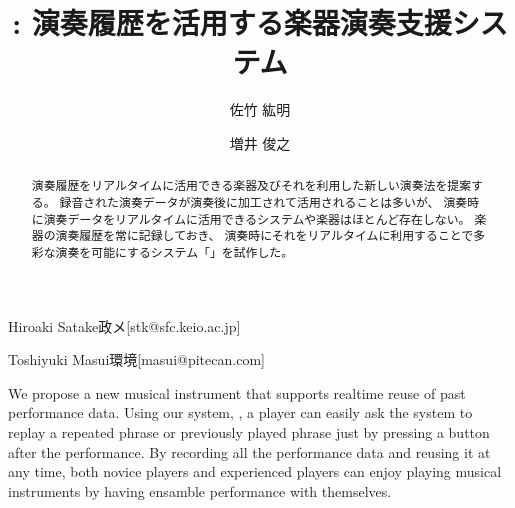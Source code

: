 \documentclass[submit,techreq]{ec2017}
\begin{document}
\title{{\system}: 演奏履歴を活用する楽器演奏支援システム}


  
\author{佐竹 紘明}{Hiroaki Satake}{政メ}[stk@sfc.keio.ac.jp]
\author{増井 俊之}{Toshiyuki Masui}{環境}[masui@pitecan.com]

\begin{abstract} %
  
  演奏履歴をリアルタイムに活用できる楽器及びそれを利用した新しい演奏法を提案する。
  録音された演奏データが演奏後に加工されて活用されることは多いが、
  演奏時に演奏データをリアルタイムに活用できるシステムや楽器はほとんど存在しない。
  楽器の演奏履歴を常に記録しておき、
  演奏時にそれをリアルタイムに利用することで多彩な演奏を可能にするシステム「{\system}」を試作した。
  
\end{abstract}


\begin{eabstract}

  We propose a new musical instrument that supports realtime reuse of
  past performance data.
  Using our system, {\system},
  a player can easily ask the system to replay a repeated phrase or
  previously played phrase just by pressing a button after the performance.
  By recording all the performance data and reusing it at any time,
  both novice players and experienced players can enjoy playing musical instruments
  by having ensamble performance with themselves.
  
\end{eabstract}


\maketitle










\end{document}
